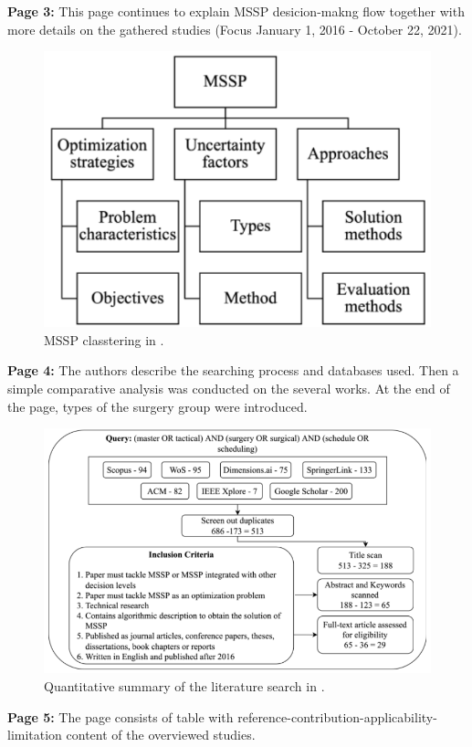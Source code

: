     \textbf{Page 3:}
    This page continues to explain MSSP desicion-makng flow together with more details on the gathered studies (Focus January 1, 2016 - October 22, 2021).
    \begin{figure}[H]
        \centering
        \includegraphics[width=.8\textwidth]{figures/0007_SR01MY22/fig1.png}
        \caption{MSSP classtering in \cite{x236}.}
        \label{fig1:0007_SR01MY22}
    \end{figure}

    \textbf{Page 4:}
    The authors describe the searching process and databases used. Then a simple comparative analysis was conducted on the several works. At the end of the page, types of the surgery group were introduced. 
    \begin{figure}[H]
        \centering
        \includegraphics[width=.8\textwidth]{figures/0007_SR01MY22/fig2.png}
        \caption{Quantitative summary of the literature search in \cite{x236}.}
        \label{fig2:0007_SR01MY22}
    \end{figure}

    \textbf{Page 5:}
    The page consists of table with reference-contribution-applicability-limitation content of the overviewed studies.

